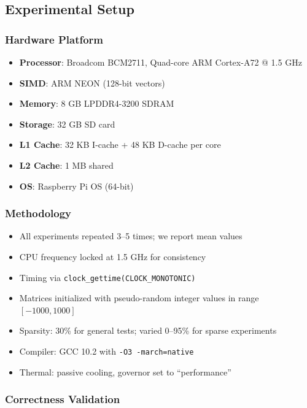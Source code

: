 \documentclass[11pt,a4paper]{article}
\theoremstyle{plain}
\theoremstyle{definition}
\begin{document}
\subsection{Experimental Setup}

\subsubsection{Hardware Platform}

\begin{itemize}
    \item \textbf{Processor}: Broadcom BCM2711, Quad-core ARM Cortex-A72 @ 1.5 GHz
    \item \textbf{SIMD}: ARM NEON (128-bit vectors)
    \item \textbf{Memory}: 8 GB LPDDR4-3200 SDRAM
    \item \textbf{Storage}: 32 GB SD card
    \item \textbf{L1 Cache}: 32 KB I-cache + 48 KB D-cache per core
    \item \textbf{L2 Cache}: 1 MB shared
    \item \textbf{OS}: Raspberry Pi OS (64-bit)
\end{itemize}

\subsubsection{Methodology}

\begin{itemize}
    \item All experiments repeated 3--5 times; we report mean values
    \item CPU frequency locked at 1.5 GHz for consistency
    \item Timing via \texttt{clock\_gettime(CLOCK\_MONOTONIC)}
    \item Matrices initialized with pseudo-random integer values in range $[-1000, 1000]$
    \item Sparsity: 30\% for general tests; varied 0--95\% for sparse experiments
    \item Compiler: GCC 10.2 with \texttt{-O3 -march=native}
    \item Thermal: passive cooling, governor set to ``performance''
\end{itemize}

\subsubsection{Correctness Validation}
\end{document}
